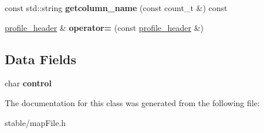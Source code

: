 \begin{DoxyCompactItemize}
\item 
\hypertarget{classmapfile__header_af8af9adc37190fd9c12a2c3e86e0edb7}{const std\-::string {\bfseries getcolumn\-\_\-name} (const count\-\_\-t \&) const }\label{classmapfile__header_af8af9adc37190fd9c12a2c3e86e0edb7}

\item 
\hypertarget{classmapfile__header_a0cee3661632639de71ee816c54ffc355}{\hyperlink{classprofile__header}{profile\-\_\-header} \& {\bfseries operator=} (const \hyperlink{classprofile__header}{profile\-\_\-header} \&)}\label{classmapfile__header_a0cee3661632639de71ee816c54ffc355}

\end{DoxyCompactItemize}
\subsection*{Data Fields}
\begin{DoxyCompactItemize}
\item 
\hypertarget{classmapfile__header_a7f33b6ecfa1270cce5bba633a10cc1b0}{char {\bfseries control}}\label{classmapfile__header_a7f33b6ecfa1270cce5bba633a10cc1b0}

\end{DoxyCompactItemize}


The documentation for this class was generated from the following file\-:\begin{DoxyCompactItemize}
\item 
stable/map\-File.\-h\end{DoxyCompactItemize}
